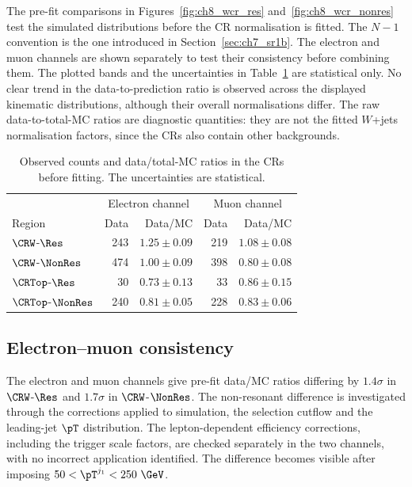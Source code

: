 The pre-fit comparisons in Figures~\ref{fig:ch8_wcr_res} and~\ref{fig:ch8_wcr_nonres} test the simulated distributions before the CR normalisation is fitted.
The $N-1$ convention is the one introduced in Section~\ref{sec:ch7_sr1b}.
The electron and muon channels are shown separately to test their consistency before combining them.
The plotted bands and the uncertainties in Table~\ref{tab:ch8_cr_prefit} are statistical only.
No clear trend in the data-to-prediction ratio is observed across the displayed kinematic distributions, although their overall normalisations differ.
The raw data-to-total-MC ratios are diagnostic quantities: they are not the fitted $W$+jets normalisation factors, since the CRs also contain other backgrounds.

\begin{table}[htbp]
    \centering
    \small
    \caption{Observed counts and data/total-MC ratios in the CRs before fitting. The uncertainties are statistical.}
    \label{tab:ch8_cr_prefit}
    \begin{tabular}{lrrrr}
        \toprule
         & \multicolumn{2}{c}{Electron channel} & \multicolumn{2}{c}{Muon channel} \\
        Region & Data & Data/MC & Data & Data/MC \\
        \midrule
        $\CRW$-$\Res$ & 243 & $1.25\pm0.09$ & 219 & $1.08\pm0.08$ \\
        $\CRW$-$\NonRes$ & 474 & $1.00\pm0.09$ & 398 & $0.80\pm0.08$ \\
        $\CRTop$-$\Res$ & 30 & $0.73\pm0.13$ & 33 & $0.86\pm0.15$ \\
        $\CRTop$-$\NonRes$ & 240 & $0.81\pm0.05$ & 228 & $0.83\pm0.06$ \\
        \bottomrule
    \end{tabular}
\end{table}


\clearpage
\subsection{Electron--muon consistency}
\label{subsec:ch8_emu}

The electron and muon channels give pre-fit data/MC ratios differing by $1.4\sigma$ in $\CRW$-$\Res$ and $1.7\sigma$ in $\CRW$-$\NonRes$.
The non-resonant difference is investigated through the corrections applied to simulation, the selection cutflow and the leading-jet $\pT$ distribution.
The lepton-dependent efficiency corrections, including the trigger scale factors, are checked separately in the two channels, with no incorrect application identified.
The difference becomes visible after imposing $50<\pT^{j_1}<250~\GeV$.

